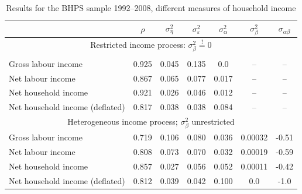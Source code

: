 \begin{table}%
\begin{tabular}{l|cccccc}
                     &$\rho$ & $\sigma^2_{\eta}$&$\sigma^2_{\varepsilon}$&$\sigma^2_{\alpha}$&$\sigma^2_{\beta}$&$\sigma_{\alpha \beta}$\\
\hline
\hline
\multicolumn{7}{c}{Restricted income process: $\sigma^2_{\beta} \stackrel{!}{=} 0$} \\
\hline \\
Gross labour income   & 0.925 &  0.045           &   0.135                &       0.0         &        --        &        --             \\
Net labour income     & 0.867 &  0.065           &   0.077                &       0.017       &        --        &        --             \\
Net household income  & 0.921 &  0.026           &   0.046                &       0.012       &        --        &        --             \\
Net household income (deflated) & 0.817 &  0.038 &   0.038                &       0.084       &        --        &        --             \\
\hline
\multicolumn{7}{c}{Heterogeneous income process; $\sigma^2_{\beta}$ unrestricted} \\
\hline
Gross labour income   & 0.719 &  0.106           &   0.080                &       0.036       &     0.00032      &       -0.51           \\
Net labour income     & 0.808 &  0.073           &   0.070                &       0.032       &     0.00019      &       -0.59           \\
Net household income  & 0.857 &  0.027           &   0.056                &       0.052       &     0.00011      &       -0.42           \\
Net household income (deflated) & 0.812 &  0.039 &   0.042                &       0.100       &        0.0       &       -1.0            \\
\hline
\end{tabular}
\caption{Results for the BHPS sample 1992--2008, different measures of household income}
\label{tab:BHPS_results}
\end{table}


